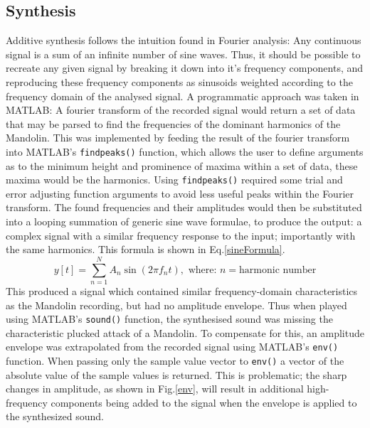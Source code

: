 \documentclass{article}
\begin{document}
    \subsection{Synthesis}
        Additive synthesis follows the intuition found in Fourier analysis: Any continuous signal is a sum of an infinite number of sine waves.
        Thus, it should be possible to recreate any given signal by breaking it down into it's frequency components, and reproducing these frequency components as sinusoids weighted according to the frequency domain of the analysed signal.
        A programmatic approach was taken in MATLAB: A fourier transform of the recorded signal would return a set of data that may be parsed to find the frequencies of the dominant harmonics of the Mandolin.
        This was implemented by feeding the result of the fourier transform into MATLAB's \texttt{findpeaks()} function, which allows the user to define arguments as to the minimum height and prominence of maxima within a set of data, these maxima would be the harmonics.
        Using \texttt{findpeaks()} required some trial and error adjusting function arguments to avoid less useful peaks within the Fourier transform.
        The found frequencies and their amplitudes would then be substituted into a looping summation of generic sine wave formulae, to produce the output: a complex signal with a similar frequency response to the input; importantly with the same harmonics.
        This formula is shown in Eq.\ref{sineFormula}.
        \begin{equation}
            y[t] = \sum_{n=1}^{N} A_n \sin{(2 \pi f_n t)}, \text{ where: } n = \text{harmonic number}
            \label{sineFormula}
        \end{equation}
        This produced a signal which contained similar frequency-domain characteristics as the Mandolin recording, but had no amplitude envelope.
        Thus when played using MATLAB's \texttt{sound()} function, the synthesised sound was missing the characteristic plucked attack of a Mandolin.
        To compensate for this, an amplitude envelope was extrapolated from the recorded signal using MATLAB's \texttt{env()} function.
        When passing only the sample value vector to \texttt{env()} a vector of the absolute value of the sample values is returned.
        This is problematic; the sharp changes in amplitude, as shown in Fig.\ref{env}, will result in additional high-frequency components being added to the signal when the envelope is applied to the synthesized sound.
\end{document}

